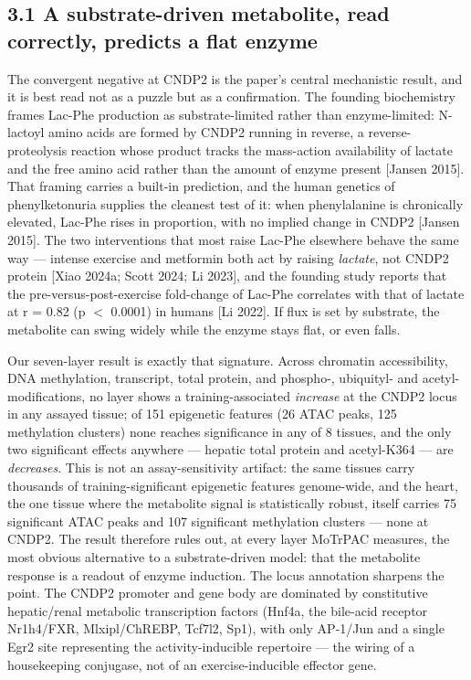 \documentclass[11pt]{article}
\begin{document}
\subsection*{3.1 A substrate-driven metabolite, read correctly, predicts a flat enzyme}

The convergent negative at CNDP2 is the paper's central mechanistic result, and it is best
read not as a puzzle but as a confirmation. The founding biochemistry frames Lac-Phe
production as substrate-limited rather than enzyme-limited: N-lactoyl amino acids are formed
by CNDP2 running in reverse, a reverse-proteolysis reaction whose product tracks the
mass-action availability of lactate and the free amino acid rather than the amount of enzyme
present [Jansen 2015]. That framing carries a built-in prediction, and the human genetics
of phenylketonuria supplies the cleanest test of it: when phenylalanine is chronically
elevated, Lac-Phe rises in proportion, with no implied change in CNDP2 [Jansen 2015]. The
two interventions that most raise Lac-Phe elsewhere behave the same way --- intense exercise
and metformin both act by raising \textit{lactate}, not CNDP2 protein [Xiao 2024a; Scott 2024;
Li 2023], and the founding study reports that the pre-versus-post-exercise fold-change of
Lac-Phe correlates with that of lactate at r = 0.82 (p $<$ 0.0001) in humans [Li 2022]. If
flux is set by substrate, the metabolite can swing widely while the enzyme stays flat, or
even falls.

Our seven-layer result is exactly that signature. Across chromatin accessibility, DNA
methylation, transcript, total protein, and phospho-, ubiquityl- and acetyl-modifications,
no layer shows a training-associated \textit{increase} at the CNDP2 locus in any assayed tissue;
of 151 epigenetic features (26 ATAC peaks, 125 methylation clusters) none reaches
significance in any of 8 tissues, and the only two significant effects anywhere --- hepatic
total protein and acetyl-K364 --- are \textit{decreases}. This is not an assay-sensitivity artifact:
the same tissues carry thousands of training-significant epigenetic features genome-wide,
and the heart, the one tissue where the metabolite signal is statistically robust, itself
carries 75 significant ATAC peaks and 107 significant methylation clusters --- none at CNDP2.
The result therefore rules out, at every layer MoTrPAC measures, the most obvious
alternative to a substrate-driven model: that the metabolite response is a readout of enzyme
induction. The locus annotation sharpens the point. The CNDP2 promoter and gene body are
dominated by constitutive hepatic/renal metabolic transcription factors (Hnf4a, the
bile-acid receptor Nr1h4/FXR, Mlxipl/ChREBP, Tcf7l2, Sp1), with only AP-1/Jun and a single
Egr2 site representing the activity-inducible repertoire --- the wiring of a housekeeping
conjugase, not of an exercise-inducible effector gene.
\end{document}
